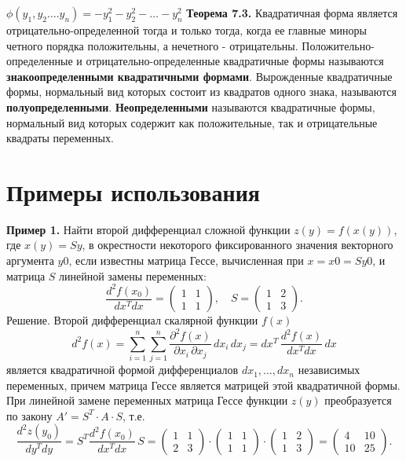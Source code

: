 \documentclass[bachelor, och, coursework, times]{SCWorks}
\newcommand\tab[1][1cm]{\hspace*{#1}}
\newcommand{\tl}{\newline\tab}
\begin{document}
$\phi(y_1,y_2….y_n)= -y_{1}^2-y_{2}^2 -…- y_{n}^2$
\tl
\textbf{Теорема 7.3.} Квадратичная форма является отрицательно-определенной тогда и только тогда, когда ее главные миноры четного порядка положительны, а нечетного - отрицательны. \cite{berezina}
\tl
Положительно-определенные и отрицательно-определенные квадратичные формы называются \textbf{знакоопределенными квадратичными формами}.
\tl
Вырожденные квадратичные формы, нормальный вид которых состоит из квадратов одного знака, называются \textbf{полуопределенными}. \textbf{Неопределенными} называются квадратичные формы, нормальный вид которых содержит как положительные, так и отрицательные квадраты переменных. \cite{berezina}

\section{Примеры использования}
\tab \textbf{Пример 1.} Найти второй дифференциал сложной функции $z(y)=f(x(y))$, где $x(y)=Sy$, в окрестности некоторого фиксированного значения векторного аргумента $y0$, если известны матрица Гессе, вычисленная при $x=x0=Sy0$, и матрица $S$
линейной замены переменных:
$$\frac{d^2f(x_0)}{dx^Tdx}
=\begin{pmatrix}
1&1\\
1&1
\end{pmatrix}\!,\quad 
S=
\begin{pmatrix}
1&2\\
1&3
\end{pmatrix}\!.$$
Решение. Второй дифференциал скалярной функции $f(x)$
$$d^2f(x)=\sum_{i=1}^{n}\sum_{j=1}^{n}\frac{\partial^2f(x)}{\partial x_i\,\partial x_j}\,dx_i\,dx_j= dx^T\,\frac{d^2f(x)}{dx^Tdx}\,dx$$
является квадратичной формой дифференциалов $dx_1,…,dx_n$
независимых переменных, причем матрица Гессе является матрицей этой квадратичной формы. При линейной замене переменных матрица Гессе функции $z(y)$ преобразуется по закону $A'=S^T\cdot A\cdot S$, т.е.
$$\frac{d^2z(y_0)}{dy^Tdy}= S^T\frac{d^2f(x_0)}{dx^Tdx}\,S= \begin{pmatrix}
1&1\\
2&3
\end{pmatrix}\!\cdot\! 
\begin{pmatrix}
1&1\\
1&1
\end{pmatrix}\!\cdot\! 
\begin{pmatrix} 
1&2\\
1&3
\end{pmatrix} = 
\begin{pmatrix} 
4&10\\
10&25
\end{pmatrix}\!.$$
\end{document}

